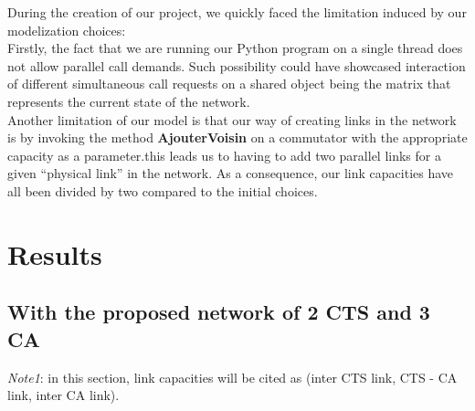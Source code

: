 \documentclass[lettersize,journal]{IEEEtran} %
\begin{document}
During the creation of our project, we quickly faced the limitation induced by our modelization choices:\\
Firstly, the fact that we are running our Python program on a single thread does not allow parallel call demands. Such possibility
could have showcased interaction of different simultaneous call requests on a shared object being the matrix that represents the current
state of the network.\\
Another limitation of our model is that our way of creating links in the network is by invoking the method \textbf{AjouterVoisin} on 
a commutator with the appropriate capacity as a parameter.this leads us to having to add two parallel links for a given ``physical link''
in the network. As a consequence, our link capacities have all been divided by two compared to the initial choices.

\section{Results}
\subsection{With the proposed network of 2 CTS and 3 CA}
\emph{Note1}: in this section, link capacities will be cited as (inter CTS link, CTS - CA link, inter CA link).
\end{document}
